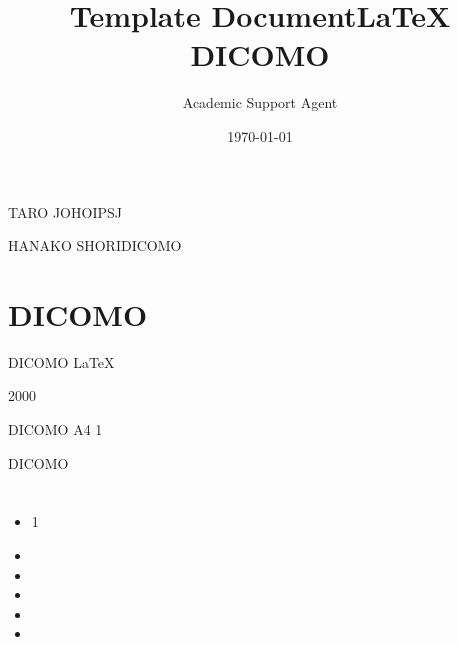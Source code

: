\documentclass{article}
\title{Template Document}
\author{Academic Support Agent}
\date{\today}
\begin{document}
\maketitle

%  
\title{{\LaTeX} DICOMO }

%  

%  

\author{   }{TARO JOHO}{IPSJ}
\author{   }{HANAKO SHORI}{DICOMO}

%  
\maketitle

%  
\section{DICOMO }
DICOMO \LaTeX  
 
 2000 
 
 
 
 

 DICOMO 
 A4 1 
 
 

 
 
 
 
 DICOMO 
 

\section{ }
\begin{itemize}
\item  

 1
 

\item  

 
 

\item  

 

\item  

 

\item  

 
 

\item  

 
 
 

\end{itemize}
\end{document}
